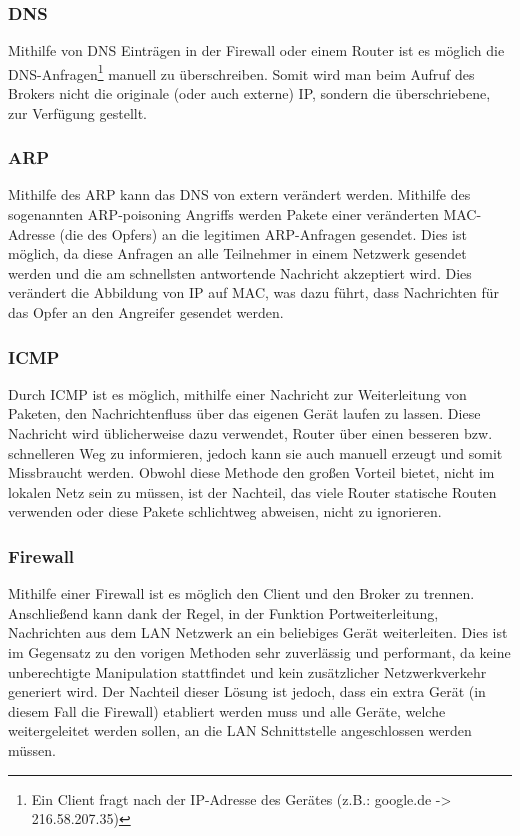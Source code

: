         \subsubsection{DNS}
        Mithilfe von \ac{DNS} Einträgen in der Firewall oder einem Router ist es möglich die \ac{DNS}-Anfragen\footnote{Ein Client fragt nach der IP-Adresse des Gerätes (z.B.: google.de -> 216.58.207.35)} manuell zu überschreiben. Somit wird man beim Aufruf des Brokers nicht die originale (oder auch externe) \ac{IP}, sondern die überschriebene, zur Verfügung gestellt.
        \subsubsection{ARP}
        Mithilfe des \ac{ARP} kann das \ac{DNS} von extern verändert werden. Mithilfe des sogenannten \ac{ARP}-poisoning Angriffs werden Pakete einer veränderten \ac{MAC}-Adresse (die des Opfers) an die legitimen \ac{ARP}-Anfragen gesendet. Dies ist möglich, da diese Anfragen an alle Teilnehmer in einem Netzwerk gesendet werden und die am schnellsten antwortende Nachricht akzeptiert wird. Dies verändert die Abbildung von \ac{IP} auf \ac{MAC}, was dazu führt, dass Nachrichten für das Opfer an den Angreifer gesendet werden. \cite{4768661}
        \subsubsection{ICMP}
        Durch \ac{ICMP} ist es möglich, mithilfe einer Nachricht zur Weiterleitung von Paketen, den Nachrichtenfluss über das eigenen Gerät laufen zu lassen.
        Diese Nachricht wird üblicherweise dazu verwendet, Router über einen besseren bzw. schnelleren Weg zu informieren, jedoch kann sie auch manuell erzeugt und somit Missbraucht werden. Obwohl diese Methode den großen Vorteil bietet, nicht im lokalen Netz sein zu müssen, ist der Nachteil, das viele Router statische Routen verwenden oder diese Pakete schlichtweg abweisen, nicht zu ignorieren.
        \subsubsection{Firewall}
        Mithilfe einer Firewall ist es möglich den Client und den Broker zu trennen. Anschließend kann dank der Regel, in der Funktion Portweiterleitung, Nachrichten aus dem \ac{LAN} Netzwerk an ein beliebiges Gerät weiterleiten. Dies ist im Gegensatz zu den vorigen Methoden sehr zuverlässig und performant, da keine unberechtigte Manipulation stattfindet und kein zusätzlicher Netzwerkverkehr generiert wird. Der Nachteil dieser Lösung ist jedoch, dass ein extra Gerät (in diesem Fall die Firewall) etabliert werden muss und alle Geräte, welche weitergeleitet werden sollen, an die \ac{LAN} Schnittstelle angeschlossen werden müssen.
        
